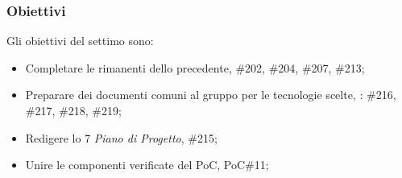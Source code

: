 \subsubsection{Obiettivi}
\label{sec:sprint7_obiettivi}
Gli obiettivi del settimo  sono:
\begin{itemize}
    \item Completare le  rimanenti dello  precedente,  \#202, \#204, \#207, \#213; 
    \item Preparare dei documenti comuni al gruppo per le tecnologie scelte, : \#216, \#217, \#218, \#219;
    \item Redigere lo  7 \textit{Piano di Progetto},  \#215;
    \item Unire le componenti verificate del PoC,  PoC\#11;
\end{itemize}
